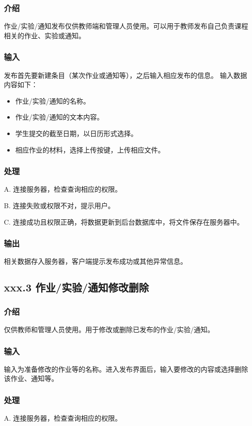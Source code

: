       \subsubsection{介绍}
 	   作业/实验/通知发布仅供教师端和管理人员使用。可以用于教师发布自己负责课程相关的作业、实验或通知。
	 \subsubsection{输入}
	   发布首先要新建条目（某次作业或通知等），之后输入相应发布的信息。
	   输入数据内容如下：
    	   \begin{itemize}
	   \item 作业/实验/通知的名称。
        \item 作业/实验/通知的文本内容。
        \item 学生提交的截至日期，以日历形式选择。
        \item 相应作业的材料，选择上传按键，上传相应文件。
        \end{itemize}
	 \subsubsection{处理}
	 A. 连接服务器，检查查询相应的权限。

	 B. 连接失败或权限不对，提示用户。

	 C. 连接成功且权限正确，将数据更新到后台数据库中，将文件保存在服务器中。

	 \subsubsection{输出}
	 相关数据存入服务器，客户端提示发布成功或其他异常信息。
    \subsection{xxx.3 作业/实验/通知修改删除}
      \subsubsection{介绍}
	 仅供教师和管理人员使用。用于修改或删除已发布的作业/实验/通知。
	 \subsubsection{输入}
	 输入为准备修改的作业等的名称。进入发布界面后，输入要修改的内容或选择删除该作业、通知等。
	 \subsubsection{处理}
	 A. 连接服务器，检查查询相应的权限。

